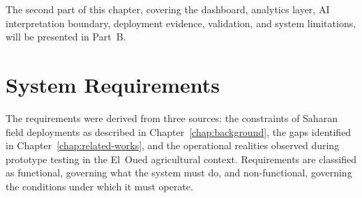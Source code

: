 The second part of this chapter, covering the dashboard, analytics layer, AI interpretation boundary, deployment evidence, validation, and system limitations, will be presented in Part~B.

\section{System Requirements}
\label{sec:requirements}

The requirements were derived from three sources: the constraints of Saharan field deployments as described in Chapter~\ref{chap:background}, the gaps identified in Chapter~\ref{chap:related-works}, and the operational realities observed during prototype testing in the El~Oued agricultural context. Requirements are classified as functional, governing what the system must do, and non-functional, governing the conditions under which it must operate.

